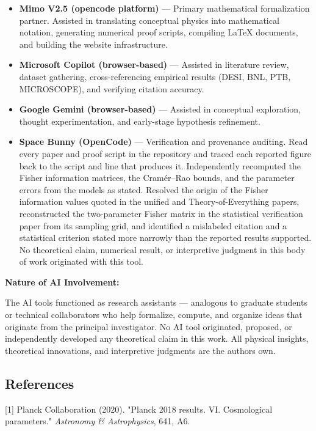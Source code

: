 \documentclass[
  10pt,
]{article}
\providecommand{\tightlist}{%
  \setlength{\itemsep}{0pt}\setlength{\parskip}{0pt}}
\begin{document}
\begin{itemize}
\tightlist
\item
  \textbf{Mimo V2.5 (opencode platform)} --- Primary mathematical
  formalization partner. Assisted in translating conceptual physics into
  mathematical notation, generating numerical proof scripts, compiling
  LaTeX documents, and building the website infrastructure.
\item
  \textbf{Microsoft Copilot (browser-based)} --- Assisted in literature
  review, dataset gathering, cross-referencing empirical results (DESI,
  BNL, PTB, MICROSCOPE), and verifying citation accuracy.
\item
  \textbf{Google Gemini (browser-based)} --- Assisted in conceptual
  exploration, thought experimentation, and early-stage hypothesis
  refinement.
\item
  \textbf{Space Bunny (OpenCode)} --- Verification and provenance
  auditing. Read every paper and proof script in the repository and
  traced each reported figure back to the script and line that produces
  it. Independently recomputed the Fisher information matrices, the
  Cramér--Rao bounds, and the parameter errors from the models as
  stated. Resolved the origin of the Fisher information values quoted in
  the unified and Theory-of-Everything papers, reconstructed the
  two-parameter Fisher matrix in the statistical verification paper from
  its sampling grid, and identified a mislabeled citation and a
  statistical criterion stated more narrowly than the reported results
  supported. No theoretical claim, numerical result, or interpretive
  judgment in this body of work originated with this tool.
\end{itemize}

\textbf{Nature of AI Involvement:}

The AI tools functioned as research assistants --- analogous to graduate
students or technical collaborators who help formalize, compute, and
organize ideas that originate from the principal investigator. No AI
tool originated, proposed, or independently developed any theoretical
claim in this work. All physical insights, theoretical innovations, and
interpretive judgments are the author\textquotesingle s own.

\hypertarget{references}{%
\subsection{References}\label{references}}

{[}1{]} Planck Collaboration (2020). "Planck 2018 results. VI.
Cosmological parameters." \emph{Astronomy \& Astrophysics}, 641, A6.
\end{document}
